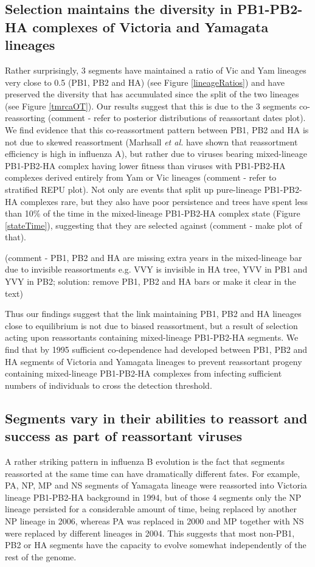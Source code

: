 \documentclass[11pt,oneside,letterpaper]{article}
\begin{document}
\subsection*{Selection maintains the diversity in PB1-PB2-HA complexes of Victoria and Yamagata lineages}
Rather surprisingly, 3 segments have maintained a ratio of Vic and Yam lineages very close to 0.5 (PB1, PB2 and HA) (see Figure \ref{lineageRatios}) and have preserved the diversity that has accumulated since the split of the two lineages (see Figure \ref{tmrcaOT}).
Our results suggest that this is due to the 3 segments co-reassorting (comment - refer to posterior distributions of reassortant dates plot).
We find evidence that this co-reassortment pattern between PB1, PB2 and HA is not due to skewed reassortment (Marhsall \textit{et al.} \cite{marshall2013} have shown that reassortment efficiency is high in influenza A), but rather due to viruses bearing mixed-lineage PB1-PB2-HA complex having lower fitness than viruses with PB1-PB2-HA complexes derived entirely from Yam or Vic lineages (comment - refer to stratified REPU plot).
Not only are events that split up pure-lineage PB1-PB2-HA complexes rare, but they also have poor persistence and trees have spent less than 10\% of the time in the mixed-lineage PB1-PB2-HA complex state (Figure \ref{stateTime}), suggesting that they are selected against (comment - make plot of that).

(comment - PB1, PB2 and HA are missing extra years in the mixed-lineage bar due to invisible reassortments e.g. VVY is invisible in HA tree, YVV in PB1 and YVY in PB2; solution: remove PB1, PB2 and HA bars or make it clear in the text)


Thus our findings suggest that the link maintaining PB1, PB2 and HA lineages close to equilibrium is not due to biased reassortment, but a result of selection acting upon reassortants containing mixed-lineage PB1-PB2-HA segments.
We find that by 1995 sufficient co-dependence had developed between PB1, PB2 and HA segments of Victoria and Yamagata lineages to prevent reassortant progeny containing mixed-lineage PB1-PB2-HA complexes from infecting sufficient numbers of individuals to cross the detection threshold.

\subsection*{Segments vary in their abilities to reassort and success as part of reassortant viruses}
A rather striking pattern in influenza B evolution is the fact that segments reassorted at the same time can have dramatically different fates.
For example, PA, NP, MP and NS segments of Yamagata lineage were reassorted into Victoria lineage PB1-PB2-HA background in 1994, but of those 4 segments only the NP lineage persisted for a considerable amount of time, being replaced by another NP lineage in 2006, whereas PA was replaced in 2000 and MP together with NS were replaced by different lineages in 2004.
This suggests that most non-PB1, PB2 or HA segments have the capacity to evolve somewhat independently of the rest of the genome.
\end{document}
